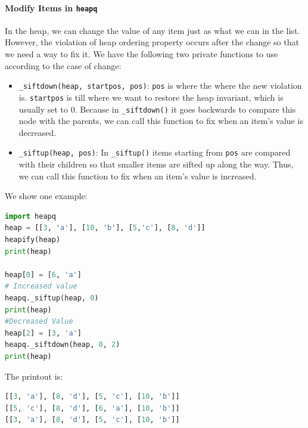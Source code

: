 \documentclass[../main.tex]{subfiles}
\begin{document}
\paragraph{Modify Items in \texttt{heapq}}
In the heap, we can change the value of any item just as what we can in the list. However, the violation of heap ordering property occurs after the change so that we need a way to fix it. We have the following two private functions to use according to the case of change: 
\begin{itemize}
    \item\texttt{\_siftdown(heap, startpos, pos)}: \texttt{pos} is where the where the new violation is. \texttt{startpos} is till where we want to restore the heap invariant, which is usually set to $0$. Because in \texttt{\_siftdown()} it goes backwards to compare this node with the parents, we can call this function to fix when an item's value is decreased. 
    \item \texttt{\_siftup(heap, pos)}: In \texttt{\_siftup()} items starting from \texttt{pos} are compared with their children so that smaller items are sifted up along the way. Thus, we can call this function to fix when an item's value is increased. 
\end{itemize}
We show one example:
\begin{lstlisting}[language=Python]
import heapq
heap = [[3, 'a'], [10, 'b'], [5,'c'], [8, 'd']]
heapify(heap)
print(heap)

heap[0] = [6, 'a']
# Increased value
heapq._siftup(heap, 0) 
print(heap)
#Decreased Value
heap[2] = [3, 'a']
heapq._siftdown(heap, 0, 2)
print(heap)
\end{lstlisting}
The printout is:
\begin{lstlisting}[language=Python]
[[3, 'a'], [8, 'd'], [5, 'c'], [10, 'b']]
[[5, 'c'], [8, 'd'], [6, 'a'], [10, 'b']]
[[3, 'a'], [8, 'd'], [5, 'c'], [10, 'b']]
\end{lstlisting}

\end{document}

